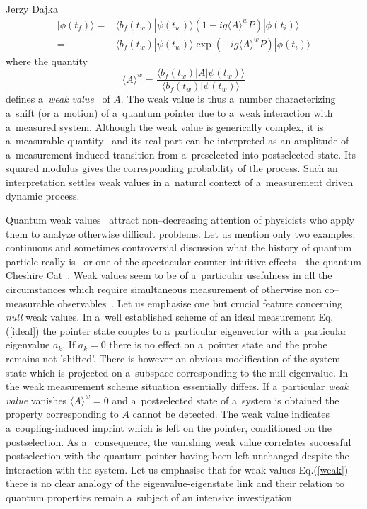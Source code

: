 \begin{artengenv}{Jerzy Dajka}
\begin{equation}
\begin{split}
    |\phi(t_f)\rangle= &\langle b_f(t_w)|\psi(t_w)\rangle \left( 1-ig\langle A\rangle^w P\right)|\phi(t_i)\rangle\\
    =&\langle b_f(t_w)|\psi(t_w)\rangle\exp(-ig\langle A\rangle^wP)|\phi(t_i)\rangle
\end{split}
\end{equation}
where the quantity
\begin{equation}\label{weak}
    \langle A\rangle^w=\frac{\langle b_f(t_w)|A|\psi(t_w)\rangle}{\langle b_f(t_w)|\psi(t_w)\rangle}
\end{equation}
 defines a~{\it weak value}~\parencite{primus} of $A$. The weak value is thus a~number characterizing
a~shift (or a~motion) of a~quantum pointer due to a~weak interaction with a~measured system. Although the weak value is generically  complex, it is a~measurable quantity~\parencite{weak_rmp} and its real part can be interpreted as an amplitude of a~measurement induced transition from a~preselected into postselected state. Its squared modulus gives the corresponding probability of the process. Such an interpretation settles  weak values in a~natural context of a~measurement driven dynamic process. 

Quantum weak values~\parencite{primus} attract non--decreasing attention of physicists who  apply them to analyze otherwise difficult problems. Let us mention only two examples: continuous and sometimes controversial discussion what the history of quantum particle really is~\parencite{PhysRevA.87.052104,PhysRevA.89.024102,PhysRevA.96.022126} or one of the  spectacular counter-intuitive effects---the quantum Cheshire Cat~\parencite{cat}. Weak values seem to be of a~particular usefulness in all the circumstances which  require simultaneous measurement of otherwise non co--measurable observables~\parencite{cat,weak,e20110854,Aharonov2008,weak_rmp}.  
%
Let us emphasise one but crucial feature concerning {\it null} weak values. In a~well established scheme of an ideal measurement Eq.(\ref{ideal}) the pointer state couples to a~particular eigenvector with a~particular eigenvalue $a_k$. If $a_k=0$ there is no effect on a~pointer state and the probe remains not 'shifted'. There is however an obvious modification of the system state which is projected on a~subspace corresponding to the null eigenvalue. In the weak measurement scheme situation essentially differs. If a~particular {\it weak value} vanishes $\langle A\rangle^w=0$  and a~postselected state of a~system is obtained  the property corresponding to $A$ cannot be detected. The weak value indicates a~coupling-induced imprint which is left on the pointer, conditioned on the postselection. As a~ consequence, the vanishing weak value
correlates successful postselection with the quantum pointer having been left unchanged despite the interaction with the system. Let us emphasise that for  weak values Eq.(\ref{weak})  there is no clear analogy of the eigenvalue-eigenstate link and their relation to quantum properties remain a~subject of an intensive investigation~\parencite{Matzkin_prop,weak,e20110854} 


\end{artengenv}
